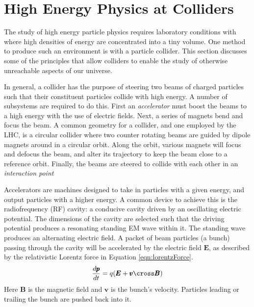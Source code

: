 \section{High Energy Physics at Colliders}

The study of high energy particle physics requires laboratory conditions with where high densities of energy are concentrated into a tiny volume.
One method to produce such an environment is with a particle collider.
This section discusses some of the principles that allow colliders to enable the study of otherwise unreachable aspects of our universe.

In general, a collider has the purpose of steering two beams of charged particles such that their constituent particles collide with high energy.
A number of subsystems are required to do this.
First an \emph{accelerator} must boost the beams to a high energy with the use of electric fields.
Next, a series of magnets bend and focus the beam. 
A common geometry for a collider, and one employed by the LHC, is a circular collider where two counter rotating beams are guided by dipole magnets around in a circular orbit.
Along the orbit, various magnets will focus and defocus the beam, and alter its trajectory to keep the beam close to a reference orbit.
Finally, the beams are steered to collide with each other in an \emph{interaction point}

Accelerators are machines designed to take in particles with a given energy, and output particles with a higher energy.
A common device to achieve this is the radiofrequency (RF) cavity: a conducive cavity driven by an oscillating electric potential.
The dimensions of the cavity are selected such that the driving potential produces a resonating standing EM wave within it.
The standing wave produces an alternating electric field.
A packet of beam particles (a bunch) passing through the cavity will be accelerated by the electric field $\pmb E$, as described by the relativistic Lorentz force in Equation \ref{eqn:lorentzForce}.
\begin{equation}\begin{split}\label{eqn:lorentzForce}
\frac{d\pmb{p}}{dt}=q(\pmb E+\pmb v\cross\pmb B)
\end{split}\end{equation} 
Here $\pmb B$ is the magnetic field and $\pmb v$ is the bunch's velocity.
Particles leading or trailing the bunch are pushed back into it.

